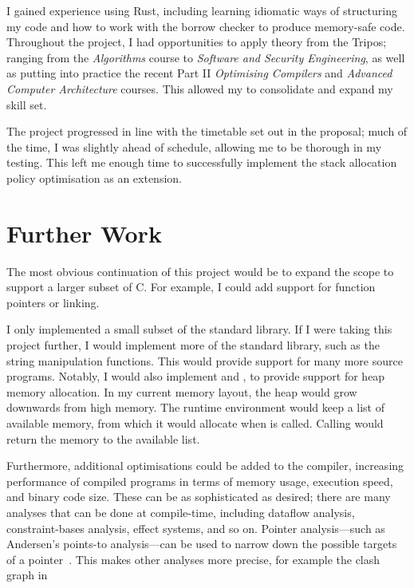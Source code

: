 \documentclass[00-main.tex]{subfiles}
\begin{document}
I gained experience using Rust, including learning idiomatic ways of structuring my code and how to work with the borrow checker to produce memory-safe code.
Throughout the project, I had opportunities to apply theory from the Tripos; ranging from the \emph{Algorithms} course to \emph{Software and Security Engineering}, as well as putting into practice the recent Part II \emph{Optimising Compilers} and \emph{Advanced Computer Architecture} courses.
This allowed my to consolidate and expand my skill set.

The project progressed in line with the timetable set out in the proposal; much of the time, I was slightly ahead of schedule, allowing me to be thorough in my testing.
This left me enough time to successfully implement the stack allocation policy optimisation as an extension.

\section{Further Work}

The most obvious continuation of this project would be to expand the scope to support a larger subset of C.
For example, I could add support for function pointers or linking.

I only implemented a small subset of the standard library.
If I were taking this project further, I would implement more of the standard library, such as the string manipulation functions.
This would provide support for many more source programs.
Notably, I would also implement  and , to provide support for heap memory allocation.
In my current memory layout, the heap would grow downwards from high memory.
The runtime environment would keep a list of available memory, from which it would allocate when  is called.
Calling  would return the memory to the available list.

Furthermore, additional optimisations could be added to the compiler, increasing performance of compiled programs in terms of memory usage, execution speed, and binary code size.
These can be as sophisticated as desired; there are many analyses that can be done at compile-time, including dataflow analysis, constraint-bases analysis, effect systems, and so on.
Pointer analysis---such as Andersen's points-to analysis---can be used to narrow down the possible targets of a pointer~.
This makes other analyses more precise, for example the clash graph in~
\end{document}
